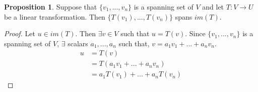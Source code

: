\documentclass{report}
\theoremstyle{definition}
\newtheorem{_prop}[_thm]{Proposition}
\theoremstyle{remark}
\begin{document}
\begin{_prop}
Suppose that $\{v_1,...,v_n\}$ is a spanning set of $V$ and let $T:V\rightarrow U$ be a linear transformation.
Then $\{T(v_1),...,T(v_n)\}$ spans $im(T)$.
\end{_prop}

\begin{proof}
Let $u\in im(T)$.
Then $\exists v\in V$ such that $u=T(v)$.
Since $\{v_1,...,v_n\}$ is a spanning set of $V$, $\exists$ scalars $a_1,...,a_n$ such that, $v=a_1v_1+...+a_nv_n$.
\begin{align*}
 u&=T(v)\\
 &=T(a_1v_1+...+a_nv_n)\\
 &=a_1T(v_1)+...+a_nT(v_n)
\end{align*}
\end{proof}
\end{document}
